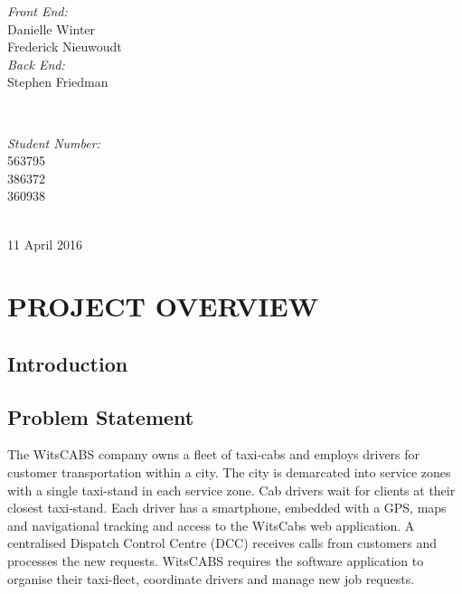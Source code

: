\documentclass[12pt]{article}
\begin{document}
\begin{titlepage}

\begin{minipage}{0.4\textwidth}
\begin{flushleft} 
\emph{Front End:}\\
Danielle Winter\\
Frederick Nieuwoudt\\[0.1cm]
\emph{Back End:}\\
Stephen Friedman
\end{flushleft}
\end{minipage}
~
\begin{minipage}{0.4\textwidth}
\begin{flushright} 
\emph{Student Number:} \\
563795\\
386372\\[0.6cm]
360938
\end{flushright}
\end{minipage}\\[0.5cm]

{\large 11 April 2016}\\[0.5cm]

\begin{abstract}

\end{abstract}

\vfill %

\end{titlepage}
\tableofcontents
\newpage
\section{PROJECT OVERVIEW}
\subsection{Introduction}

\subsection{Problem Statement}
The WitsCABS company owns a fleet of taxi-cabs and employs drivers for customer transportation within a city. The city is demarcated into service zones with a single taxi-stand in each service zone. Cab drivers wait for clients at their closest taxi-stand. Each driver has a smartphone, embedded with a GPS, maps and navigational tracking and access to the WitsCabs web application. A centralised Dispatch Control Centre (DCC) receives calls from customers and processes the new requests. WitsCABS requires the software application to organise their taxi-fleet, coordinate drivers and manage new job requests.
\end{document}
